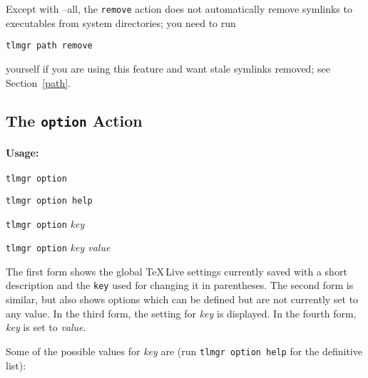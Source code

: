 \documentclass[11pt]{article}
\begin{document}
\begin{sloppypar}
\par\noindent
Except with --all, the \texttt{remove} action does not automatically remove symlinks to executables
from system directories; you need to run 
\end{sloppypar}
\begin{center}
\texttt{tlmgr path remove} 
\end{center}
yourself if you are using this feature and want stale
symlinks removed; see Section~\ref{path}.

\clearpage

\subsection{The {\tt option} Action}
\label{option}

\paragraph{Usage:}

\begin{list}{}{}
\item \texttt{tlmgr option} 
\item \texttt{tlmgr option help} 
\item \texttt{tlmgr option} \textsl{key}
\item \texttt{tlmgr option} \textsl{key value}
\end{list}

The first form shows the global \TeX\,Live settings currently
saved with a short description and the \texttt{key}
used for changing it in parentheses. The second form is
similar, but also shows options which can be defined but
are not currently set to any value. In the third form, the
setting for \textsl{key} is displayed. In the fourth form,
\textsl{key} is set to \textsl{value}.

Some of the possible values for \textsl{key} are (run \texttt{tlmgr
option help} for the definitive list):
\end{document}

